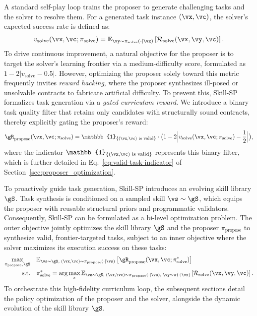 A standard self-play loop trains the proposer to generate challenging tasks and the solver to resolve them. For a generated task instance $(\vx,\vc)$, the solver's expected success rate is defined as:
\begin{equation}
v_\text{solve}(\vx,\vc;\pi_\text{solve})
=
\mathbb{E}_{\vy \sim \pi_\text{solve}(\cdot \mid \vx)}
\left[
    \mathcal{R}_\text{solve}(\vx,\vy,\vc)
\right].
\label{eq:osp_empirical_success}
\end{equation}
To drive continuous improvement, a natural objective for the proposer is to target the solver's learning frontier via a medium-difficulty score, formulated as $1 - 2|v_\text{solve} - 0.5|$. However, optimizing the proposer solely toward this metric frequently invites \emph{reward hacking}, where the proposer synthesizes ill-posed or unsolvable contracts to fabricate artificial difficulty.
To prevent this, Skill-SP formalizes task generation via a \emph{gated curriculum reward}. We introduce a binary task quality filter that retains only candidates with structurally sound contracts, thereby explicitly gating the proposer's reward:
\begin{equation}
\gR_\text{propose}(\vx,\vc;\pi_\text{solve})
=
\mathbb{1}_{\{(\vx,\vc) \text{ is valid}\}}
\cdot
\big(
    1 - 2
    \Big|
        v_\text{solve}(\vx,\vc;\pi_\text{solve})
        - \frac{1}{2}
    \Big|
\big),
\label{eq:frontier_score}
\end{equation}
where the indicator $\mathbb{1}_{\{(\vx,\vc) \text{ is valid}\}}$ represents this binary filter, which is further detailed in Eq.~\ref{eq:valid-task-indicator} of Section~\ref{sec:proposer_optimization}.

To proactively guide task generation, Skill-SP introduces an evolving skill library $\gS$. Task synthesis is conditioned on a sampled skill $\vs \sim \gS$, which equips the proposer with reusable structural priors and programmatic validators. Consequently, Skill-SP can be formulated as a bi-level optimization problem. The outer objective jointly optimizes the skill library $\gS$ and the proposer $\pi_\text{propose}$ to synthesize valid, frontier-targeted tasks, subject to an inner objective where the solver maximizes its execution success on these tasks:
\begin{equation}
\begin{aligned}
    \max_{\pi_\text{propose}, \gS} \quad
    & \mathbb{E}_{\vs \sim \gS,\;(\vx,\vc)\sim \pi_\text{propose}(\cdot\mid\vs)}
    \left[\gR_\text{propose}(\vx,\vc;\pi^*_\text{solve})\right] \\
    \text{s.t.} \quad
    &
    \pi^*_\text{solve}
    =
    \arg\max_{\pi}
    \mathbb{E}_{
        \vs\sim \gS,\; (\vx,\vc)\sim\pi_\text{propose}(\cdot\mid\vs),\;
        \vy\sim\pi(\cdot\mid\vx)
    }
    \left[
        \mathcal{R}_\text{solve}(\vx,\vy,\vc)
    \right].
\end{aligned}
\label{eq:bilevel_optimization}
\end{equation}
To orchestrate this high-fidelity curriculum loop, the subsequent sections detail the policy optimization of the proposer and the solver, alongside the dynamic evolution of the skill library $\gS$.



